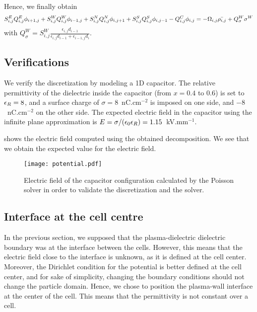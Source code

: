    Hence, we finally obtain
    \begin{equation}
    S^E_{i,j} Q^E_{i,j} \phi_{i+1,j} + S^W_{i,j} Q^W_{i,j} \phi_{i-1,j} + S^N_{i,j} Q^N_{i,j} \phi_{i,j+1} + S^S_{i,j} Q^S_{i,j} \phi_{i,j-1} - Q^C_{i,j} \phi_{i,j} = - \Omega_{i,j} \bar{\rho_{i,j}} + Q^W_{\sigma} \sigma^W
    \end{equation}
    with $Q^W_{\sigma} =  S^W_{i,j} \frac{\epsilon_{i,j}d_{i-1}}{\epsilon_{i,j}d_{i-1}+\epsilon_{i-1,j}d_{i}}$.



  \subsection{Verifications}
    We verify the discretization by modeling a \ac{1D} capacitor.
    The relative permittivity of the dielectric inside the capacitor (from $x=0.4$ to $0.6$) is set to $\epsilon_{R} = 8$, and a surface charge of  $\sigma = 8$~nC.cm$^{-2}$ is imposed on one side, and $-8$~nC.cm$^{-2}$ on the other side.
    The expected electric field in the capacitor using the infinite plane approximation is $E = \sigma/(\epsilon_0\epsilon_{R}) = 1.15$~kV.mm$^{-1}$.

     shows the electric field computed using the obtained decomposition.
    We see that we obtain the expected value for the electric field.


    \begin{figure}[hbtp]
      \label{fig-surface}
      \centering
      \texttt{[image: potential.pdf]}
      \caption{Electric field of the capacitor configuration calculated by the Poisson solver in order to validate the discretization and the solver. }
    \end{figure}


  \subsection{Interface at the cell centre}
    In the previous section, we supposed that the plasma-dielectric dielectric boundary was at the interface between the cells.
    However, this means that the electric field close to the interface is unknown, as it is defined at the cell center.
    Moreover, the Dirichlet condition for the potential is better defined at the cell center, and for sake of simplicity, changing the boundary conditions should not change the particle domain.
    Hence, we chose to position the plasma-wall interface at the center of the cell.
    This means that the permittivity is not constant over a cell.


